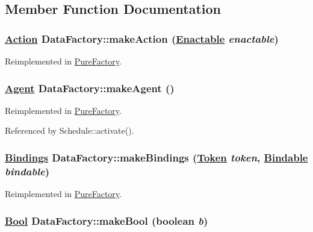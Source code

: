 \subsection{Member Function Documentation}
\hypertarget{interfaceDataFactory_a8}{
\subsubsection[makeAction]{\setlength{\rightskip}{0pt plus 5cm}\hyperlink{interfaceAction}{Action} Data\-Factory::make\-Action (\hyperlink{interfaceEnactable}{Enactable} {\em enactable})}}
\label{interfaceDataFactory_a8}




Reimplemented in \hyperlink{classPureFactory_a13}{Pure\-Factory}.\hypertarget{interfaceDataFactory_a11}{
\subsubsection[makeAgent]{\setlength{\rightskip}{0pt plus 5cm}\hyperlink{interfaceAgent}{Agent} Data\-Factory::make\-Agent ()}}
\label{interfaceDataFactory_a11}




Reimplemented in \hyperlink{classPureFactory_a9}{Pure\-Factory}.

Referenced by Schedule::activate().

\hypertarget{interfaceDataFactory_a10}{
\subsubsection[makeBindings]{\setlength{\rightskip}{0pt plus 5cm}\hyperlink{interfaceBindings}{Bindings} Data\-Factory::make\-Bindings (\hyperlink{interfaceToken}{Token} {\em token}, \hyperlink{interfaceBindable}{Bindable} {\em bindable})}}
\label{interfaceDataFactory_a10}




Reimplemented in \hyperlink{classPureFactory_a8}{Pure\-Factory}.\hypertarget{interfaceDataFactory_a4}{
\subsubsection[makeBool]{\setlength{\rightskip}{0pt plus 5cm}\hyperlink{interfaceBool}{Bool} Data\-Factory::make\-Bool (boolean {\em b})}}
\label{interfaceDataFactory_a4}




